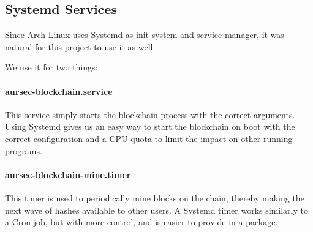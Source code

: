\subsection{Systemd Services} \label{sec:aursec-systemd}
Since Arch Linux uses Systemd as init system and service manager, it was natural for this project to use it as well.

We use it for two things:

\paragraph*{aursec-blockchain.service} This service simply starts the blockchain process with the correct arguments. Using Systemd gives us an easy way to start the blockchain on boot with the correct configuration and a CPU quota to limit the impact on other running programs.

\paragraph*{aursec-blockchain-mine.timer} This timer is used to periodically mine blocks on the chain, thereby making the next wave of hashes available to other users. A Systemd timer works similarly to a Cron job, but with more control, and is easier to provide in a package.
